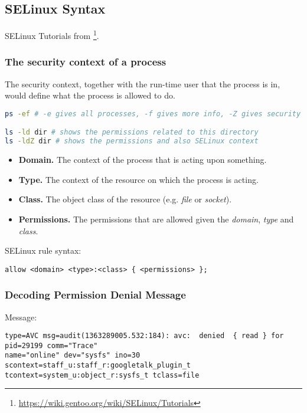 \subsection{SELinux Syntax}
\label{task:20231219_selinux}

SELinux Tutorials from \footnote{\url{https://wiki.gentoo.org/wiki/SELinux/Tutorials}}.

\subsubsection{The security context of a process}

The security context, together with the run-time user that the process is in, would define what the process is allowed to do.

\begin{lstlisting}[language=sh]
ps -ef # -e gives all processes, -f gives more info, -Z gives security context

ls -ld dir # shows the permissions related to this directory
ls -ldZ dir # shows the permissions and also SELinux context
\end{lstlisting}

\begin{itemize}
\item \textbf{Domain.} The context of the process that is acting upon something.
\item \textbf{Type.} The context of the resource on which the process is acting.
\item \textbf{Class.} The object class of the resource (e.g. \textit{file} or \textit{socket}).
\item \textbf{Permissions.} The permissions that are allowed given the \textit{domain}, \textit{type} and \textit{class}.
\end{itemize}

SELinux rule syntax:
\begin{lstlisting}
allow <domain> <type>:<class> { <permissions> };
\end{lstlisting}

\subsubsection{Decoding Permission Denial Message}

Message:
\begin{lstlisting}
type=AVC msg=audit(1363289005.532:184): avc:  denied  { read } for  pid=29199 comm="Trace" 
name="online" dev="sysfs" ino=30 scontext=staff_u:staff_r:googletalk_plugin_t 
tcontext=system_u:object_r:sysfs_t tclass=file
\end{lstlisting}

